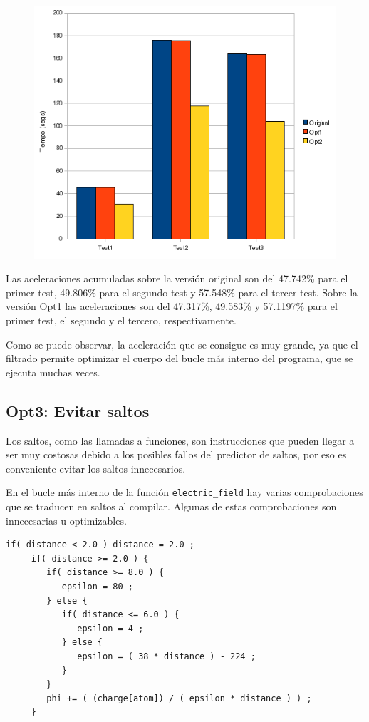 \begin{figure}[ht]
   \centering
   \includegraphics[keepaspectratio=true,width=.5\textwidth]{figures/opt2-perf}
\end{figure}

Las aceleraciones acumuladas sobre la versi\'{o}n original son del 47.742\% para
el primer test, 49.806\% para el segundo test y 57.548\% para el tercer test.
Sobre la versi\'{o}n Opt1 las aceleraciones son del 47.317\%, 49.583\% y 57.1197\%
para el primer test, el segundo y el tercero, respectivamente.

Como se puede observar, la aceleraci\'{o}n que se consigue es muy grande, ya que
el filtrado permite optimizar el cuerpo del bucle m\'{a}s interno del programa,
que se ejecuta muchas veces.

\subsection{Opt3: Evitar saltos}

Los saltos, como las llamadas a funciones, son instrucciones que pueden llegar
a ser muy costosas debido a  los posibles fallos del predictor de saltos, por
eso es conveniente evitar los saltos innecesarios.

En el bucle m\'{a}s interno de la funci\'{o}n \texttt{electric\_field} hay
varias comprobaciones que se traducen en saltos al compilar. Algunas de estas
comprobaciones son innecesarias u optimizables.

\begin{lstlisting}[]
     if( distance < 2.0 ) distance = 2.0 ;
     if( distance >= 2.0 ) {
        if( distance >= 8.0 ) {
           epsilon = 80 ;
        } else {
           if( distance <= 6.0 ) {
              epsilon = 4 ;
           } else {
              epsilon = ( 38 * distance ) - 224 ;
           }
        }
        phi += ( (charge[atom]) / ( epsilon * distance ) ) ;
     }
\end{lstlisting}

